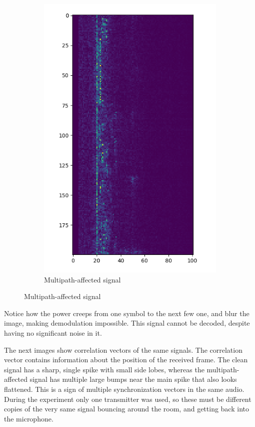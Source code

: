 \documentclass[a4paper]{article}
\begin{document}
\begin{figure}[H]
\begin{subfigure}{0.45\textwidth}
        \includegraphics[width=1\textwidth]{waterfall_sync_multipath.png}
        \caption{Multipath-affected signal}
    \end{subfigure}
\end{figure}

Notice how the power creeps from one symbol to the next few one, and
blur the image, making demodulation impossible. This signal cannot be
decoded, despite having no significant noise in it.

The next images show correlation vectors of the same signals. The
correlation vector contains information about the position of the
received frame. The clean signal has a sharp, single spike with small
side lobes, whereas the multipath-affected signal has multiple large
bumps near the main spike that also looks flattened. This is a sign of
multiple synchronization vectors in the same audio. During the
experiment only one transmitter was used, so these must be different
copies of the very same signal bouncing around the room, and getting
back into the microphone.
\end{document}
